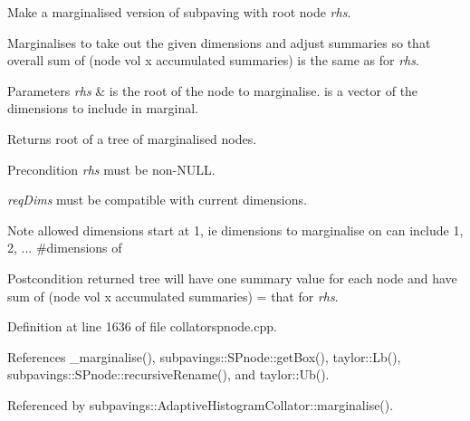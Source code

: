\-Make a marginalised version of subpaving with root node {\itshape rhs\/}. 

\-Marginalises to take out the given dimensions and adjust summaries so that overall sum of (node vol x accumulated summaries) is the same as for {\itshape rhs\/}.


\begin{DoxyParams}{\-Parameters}
{\em rhs} & is the root of the node to marginalise.  is a vector of the dimensions to include in marginal. \\
\hline
\end{DoxyParams}
\begin{DoxyReturn}{\-Returns}
root of a tree of marginalised nodes. 
\end{DoxyReturn}
\begin{DoxyPrecond}{\-Precondition}
{\itshape rhs\/} must be non-\/\-N\-U\-L\-L. 

{\itshape req\-Dims\/} must be compatible with current dimensions. 
\end{DoxyPrecond}
\begin{DoxyNote}{\-Note}
allowed dimensions start at 1, ie dimensions to marginalise on can include 1, 2, ... \#dimensions of  
\end{DoxyNote}
\begin{DoxyPostcond}{\-Postcondition}
returned tree will have one summary value for each node and have sum of (node vol x accumulated summaries) = that for {\itshape rhs\/}. 
\end{DoxyPostcond}


\-Definition at line 1636 of file collatorspnode.\-cpp.



\-References \-\_\-marginalise(), subpavings\-::\-S\-Pnode\-::get\-Box(), taylor\-::\-Lb(), subpavings\-::\-S\-Pnode\-::recursive\-Rename(), and taylor\-::\-Ub().



\-Referenced by subpavings\-::\-Adaptive\-Histogram\-Collator\-::marginalise().


